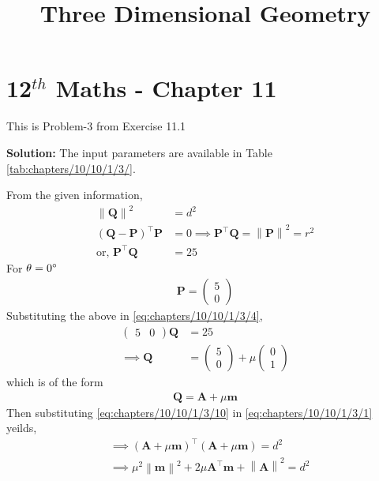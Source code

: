 \documentclass[12pt]{article}
\providecommand{\brak}[1]{\ensuremath{\left(#1\right)}}
\providecommand{\norm}[1]{\left\lVert#1\right\rVert}
\newcommand{\solution}{\noindent \textbf{Solution: }}
\newcommand{\myvec}[1]{\ensuremath{\begin{pmatrix}#1\end{pmatrix}}}
\let\vec\mathbf
\begin{document}
\begin{center}
\enlargethispage{-4cm}
\title{\textbf{Three Dimensional Geometry}}
\date{\vspace{-5ex}} %
\maketitle
\end{center}
\setcounter{page}{1}
\section*{12$^{th}$ Maths - Chapter 11}
This is Problem-3 from Exercise 11.1
\begin{enumerate}

\solution
\fi
The input parameters are available in Table \ref{tab:chapters/10/10/1/3/}.
\begin{table}[H]\centering

\caption{}
\label{tab:chapters/10/10/1/3/} 
\end{table}
From the given information, 	
\begin{align}
	\norm{\vec{Q}}^2&=d^2\label{eq:chapters/10/10/1/3/1}
	\\
\brak{\vec{Q}-\vec{P}}^{\top}\vec{P}&=0 \implies
\vec{P}^{\top}\vec{Q}=\norm{\vec{P}}^2=r^2\\
	\text{or, }	\vec{P}^{\top}\vec{Q}&=25\label{eq:chapters/10/10/1/3/4}
\end{align}
For $\theta=0\degree$ 
\begin{align}
\vec{P}=\myvec{5\\0}
\end{align}
Substituting the above in \eqref{eq:chapters/10/10/1/3/4},
\begin{align}
\myvec{5&0}\vec{Q}&=25\\
\implies 
	\vec{Q}&=\myvec{5\\0}+\mu\myvec{0\\1}\label{eq:chapters/10/10/1/3/9}
\end{align}
	which is of the form 
\begin{align}
	\vec{Q}=\vec{A}+\mu\vec{m}\label{eq:chapters/10/10/1/3/10}
\end{align}
		Then substituting \eqref{eq:chapters/10/10/1/3/10} in \eqref{eq:chapters/10/10/1/3/1} yeilds,
\begin{align}
	&\implies\brak{\vec{A}+\mu\vec{m}}^{\top}\brak{\vec{A}+\mu\vec{m}}=d^2\\
	&\implies \mu^2\norm{\vec{m}}^2+2\mu\vec{A}^{\top}\vec{m}+\norm{\vec{A}}^2=d^2\label{eq:chapters/10/10/1/3/14}

\end{align}
\end{enumerate}
\end{document}
